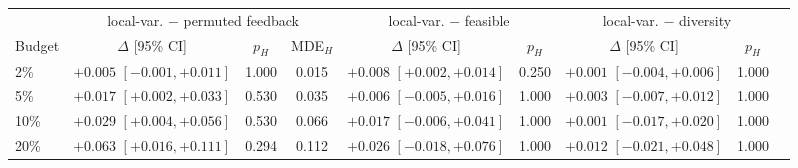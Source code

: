 \begin{tabular}{lcccccccc}
\toprule
 & \multicolumn{3}{c}{local-var. $-$ permuted feedback} & \multicolumn{2}{c}{local-var. $-$ feasible} & \multicolumn{2}{c}{local-var. $-$ diversity} \\
\cmidrule(lr){2-4}\cmidrule(lr){5-6}\cmidrule(lr){7-8}
Budget & $\Delta$ [95\% CI] & $p_H$ & MDE$_H$ & $\Delta$ [95\% CI] & $p_H$ & $\Delta$ [95\% CI] & $p_H$ \\
\midrule
2\% & ${+}0.005$ $[-0.001, {+}0.011]$ & 1.000 & 0.015 & ${+}0.008$ $[{+}0.002, {+}0.014]$ & 0.250 & ${+}0.001$ $[-0.004, {+}0.006]$ & 1.000 \\
5\% & ${+}0.017$ $[{+}0.002, {+}0.033]$ & 0.530 & 0.035 & ${+}0.006$ $[-0.005, {+}0.016]$ & 1.000 & ${+}0.003$ $[-0.007, {+}0.012]$ & 1.000 \\
10\% & ${+}0.029$ $[{+}0.004, {+}0.056]$ & 0.530 & 0.066 & ${+}0.017$ $[-0.006, {+}0.041]$ & 1.000 & ${+}0.001$ $[-0.017, {+}0.020]$ & 1.000 \\
20\% & ${+}0.063$ $[{+}0.016, {+}0.111]$ & 0.294 & 0.112 & ${+}0.026$ $[-0.018, {+}0.076]$ & 1.000 & ${+}0.012$ $[-0.021, {+}0.048]$ & 1.000 \\
\bottomrule
\end{tabular}